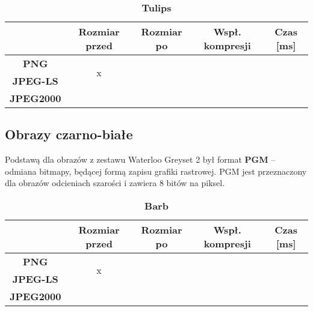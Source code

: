 \begin{table}[!h]
	\centering
	\caption{\textbf{Tulips}}
	\label{my-label}
	\begin{tabular}{|c|c|c|c|c|}                                             
		\hline
		& \textbf{Rozmiar przed} & \textbf{Rozmiar po} & \textbf{Wspł. kompresji} & \textbf{Czas {[}ms{]}} \\ \hline 
		\textbf{PNG}      &          \multicolumn{1}{c|}{\multirow{2}{*}{x}}             &                     &                          &                             \\\cline{3-5}
		\textbf{JPEG-LS}  &                        &                     &                          &                          \\\cline{3-5}
		\textbf{JPEG2000} &                        &                     &                          &                      \\ \hline
	\end{tabular}
\end{table}

\subsection{Obrazy czarno-białe}

Podstawą dla obrazów z zestawu Waterloo Greyset 2 był format \textbf{PGM} -- odmiana bitmapy, będącej formą zapisu grafiki rastrowej. PGM jest przeznaczony dla obrazów odcieniach szarości i zawiera 8 bitów na piksel.

\begin{table}[!h]
	\centering
	\caption{\textbf{Barb}}
	\label{my-label}
	\begin{tabular}{|c|c|c|c|c|}                                             
		\hline
		& \textbf{Rozmiar przed} & \textbf{Rozmiar po} & \textbf{Wspł. kompresji} & \textbf{Czas {[}ms{]}} \\ \hline 
		\textbf{PNG}      &          \multicolumn{1}{c|}{\multirow{2}{*}{x}}             &                     &                          &                             \\\cline{3-5}
		\textbf{JPEG-LS}  &                        &                     &                          &                          \\\cline{3-5}
		\textbf{JPEG2000} &                        &                     &                          &                      \\ \hline
	\end{tabular}
\end{table}

